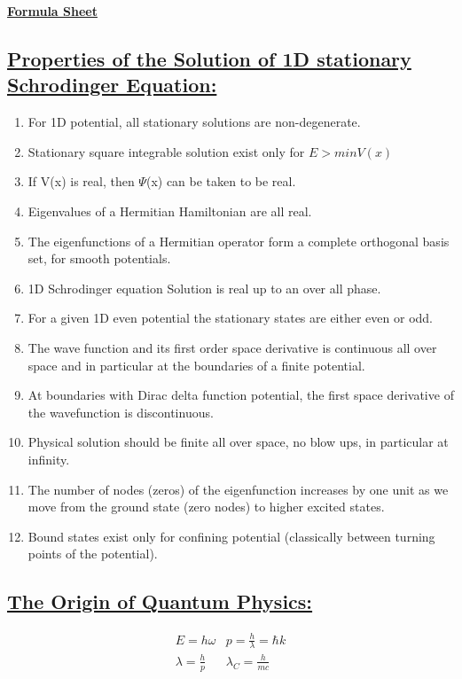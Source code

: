 \documentclass[a4paper,12pt]{article}
\begin{document}

\begin{center}\textbf{\underline{\huge{Formula Sheet}}}\end{center}
\subsection*{\underline{Properties of the Solution of 1D stationary Schrodinger Equation:}}
\begin{enumerate}
\item For 1D potential, all stationary solutions are non-degenerate.
\item Stationary square integrable solution exist only for $E > min{V(x)}$ 
\item If V(x) is real, then $\Psi$(x) can be taken to be real.
\item Eigenvalues of a Hermitian Hamiltonian are all real.
\item The eigenfunctions of a Hermitian operator form a complete orthogonal basis set, for smooth potentials.
\item 1D Schrodinger equation Solution is real up to an over all phase.
\item For a given 1D even potential the stationary states are either even or odd.
\item The wave function and its first order space derivative is continuous all over space and in particular at the boundaries of a finite potential.
\item At boundaries with Dirac delta function potential, the first space derivative of the wavefunction is discontinuous. 
\item Physical solution should be finite all over space, no blow ups, in particular at infinity.
\item The number of nodes (zeros) of the eigenfunction increases by one unit as we move from the ground state (zero nodes) to higher excited states.
\item Bound states exist only for confining potential (classically between turning points of the potential).
\end{enumerate}
\subsection*{\underline{The Origin of Quantum Physics:}}
\begin{align}
    &E=h\omega
    &p=\frac{h}{\lambda}=\hbar k
    &\\
    &\lambda=\frac{h}{p}
    &\lambda_C = \frac{h}{mc}
\end{align}
\end{document}
